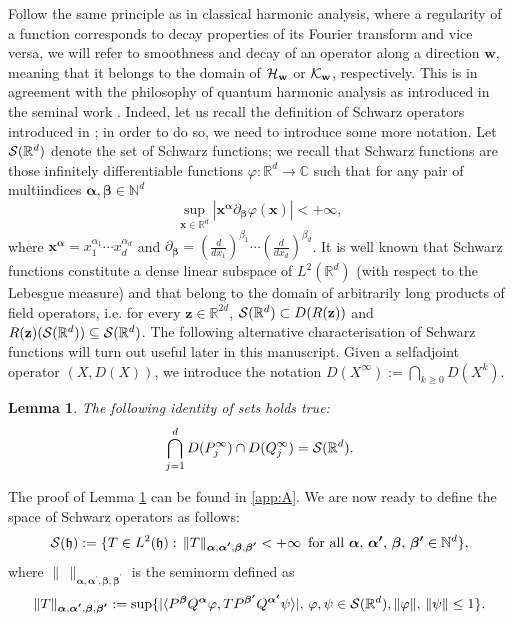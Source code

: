 \documentclass[preprint]{elsarticle}
\newtheorem{lemma}[defi]{Lemma}
\theoremstyle{definition}
\def\hh{\mathfrak{h} }
\def\CC{\mathbb{C}}
\def\RR{\mathbb{R}}
\def\hh{\mathfrak{h}}
\begin{document}
Follow the same principle as in classical harmonic analysis, where a regularity of a function corresponds to decay properties of its Fourier transform and vice versa, we will refer to smoothness and decay of an operator along a direction $\mathbf{w}$, meaning that it belongs to the domain of ${\cal H}_{\mathbf{w}}$ or ${\cal K}_{\mathbf{w}}$, respectively. This is in agreement with the philosophy of quantum harmonic analysis as introduced in the seminal work \cite{We84}. Indeed, let us recall the definition of Schwarz operators introduced in \cite{KKW16}; in order to do so, we need to introduce some more notation. Let ${\cal S}(\RR^d)$ denote the set of Schwarz functions; we recall that Schwarz functions are those infinitely differentiable functions $\varphi:\RR^d \rightarrow \CC$ such that for any pair of multiindices $\boldsymbol{\alpha}, \boldsymbol{\beta} \in \mathbb{N}^{d}$
$$\sup_{\mathbf{x} \in \RR^{d}}|\mathbf{x}^{\boldsymbol{\alpha}} \partial_{\boldsymbol{\beta}}\varphi(\mathbf{x})|<+\infty,$$
where $\mathbf{x}^{\boldsymbol{\alpha}}=x_1^{\alpha_1}\cdots x_d^{\alpha_d}$ and $\partial_{\boldsymbol{\beta}}=\left (\frac{d}{dx_1}\right )^{\beta_1} \cdots  \left (\frac{d}{dx_d}\right )^{\beta_d}$. It is well known that Schwarz functions constitute a dense linear subspace of $L^2(\RR^{d})$ (with respect to the Lebesgue measure) and that belong to the domain of arbitrarily long products of field operators, i.e. for every $\mathbf{z} \in \RR^{2d}$, ${\cal S}(\RR^d) \subset D(R(\mathbf{z}))$ and $R(\mathbf{z})({\cal S}(\RR^d))\subseteq {\cal S}(\RR^d)$. The following alternative characterisation of Schwarz functions will turn out useful later in this manuscript. Given a selfadjoint operator $(X,D(X))$, we introduce the notation $D(X^\infty):=\bigcap_{k \geq 0}D(X^k)$.
\begin{lemma} \label{lem:schwarz}
The following identity of sets holds true:
$$\bigcap_{j=1}^{d} D(P^\infty_j) \cap D(Q^\infty_j)={\cal S}(\RR^d).$$
\end{lemma}
The proof of Lemma \ref{lem:schwarz} can be found in \ref{app:A}. We are now ready to define the space of Schwarz operators as follows:
$${\cal S}(\hh):=\{T \in L^2(\hh): \, \|T\|_{\boldsymbol{\alpha},\boldsymbol{\alpha^\prime},\boldsymbol{\beta},\boldsymbol{\beta^\prime}}<+\infty\, \text{ for all }\boldsymbol{\alpha},\,\boldsymbol{\alpha^\prime},\,\boldsymbol{\beta},\,\boldsymbol{\beta^\prime}\in \mathbb{N}^d\},$$
where $\| \, \|_{\boldsymbol{\alpha},\boldsymbol{\alpha^\prime},\boldsymbol{\beta},\boldsymbol{\beta^\prime}}$ is the seminorm defined as
$$\|T\|_{\boldsymbol{\alpha},\boldsymbol{\alpha^\prime},\boldsymbol{\beta},\boldsymbol{\beta^\prime}}:=\sup\{|\langle P^{\boldsymbol{\beta}}Q^{\boldsymbol{\alpha}}\varphi, TP^{\boldsymbol{\beta^\prime}}Q^{\boldsymbol{\alpha^\prime}}\psi\rangle|,\, \varphi, \psi \in {\cal S}(\RR^d),\|\varphi\|, \, \|\psi\|\leq 1\}.$$
\end{document}
